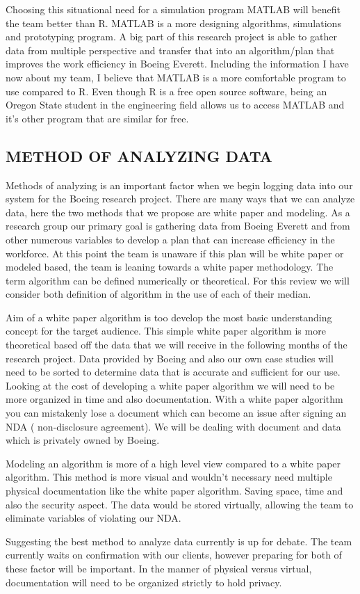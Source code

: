 \documentclass[a4,draftclsnofoot,onecolumn,margin=0.75,10pt]{IEEEtran}
\begin{document}
{   Choosing this situational need for a simulation program MATLAB will benefit the team better than R. MATLAB is a more designing algorithms, simulations and prototyping program. A big part of this research project is able to gather data from multiple perspective and transfer that into an algorithm/plan that improves the work efficiency in Boeing Everett. Including the information I have now about my team, I  believe that MATLAB is a more comfortable program to use compared to R. Even though R is a free open source software, being an Oregon State student in the engineering field allows us to access MATLAB and it's other program that are similar for free. 

}


\subsection[METHOD OF ANALYZING DATA]{\rmfamily\color{black}
METHOD OF ANALYZING DATA}
{\color{black}
   Methods of analyzing is an important factor when we begin logging data into our system for the Boeing research project. There are many ways that we can analyze data, here the two methods that we propose are white paper and modeling. As a research group our primary goal is gathering data from Boeing Everett and from other numerous variables to develop a plan that can increase efficiency in the workforce. At this point the team is unaware if this plan will be white paper or modeled based, the team is leaning towards a white paper methodology. The term algorithm can be defined numerically or theoretical. For this review we will consider both definition of algorithm in the use of each of their median. 

   Aim of a white paper algorithm is too develop the most basic understanding concept for the target audience. This simple white paper algorithm is more theoretical based off the data that we will receive in the following months of the research project. Data provided by Boeing and also our own case studies will need to be sorted to determine data that is accurate and sufficient for our use. Looking at the cost of developing a white paper algorithm we will need to be more organized in time and also documentation. With a white paper algorithm you can mistakenly lose a document which can become an issue after signing an NDA ( non-disclosure agreement). We will be dealing with document and data which is privately owned by Boeing. 

   Modeling an algorithm is more of a high level view compared to a white paper algorithm. This method is more visual and wouldn't necessary need multiple physical documentation like the white paper algorithm. Saving space, time and also the security aspect. The data would be stored virtually, allowing the team to eliminate variables of violating our NDA. 

   Suggesting the best method to analyze data currently is up for debate. The team currently waits on confirmation with our clients, however preparing for both of these factor will be important. In the manner of physical versus virtual, documentation will need to be organized strictly to hold privacy.}
\end{document}

